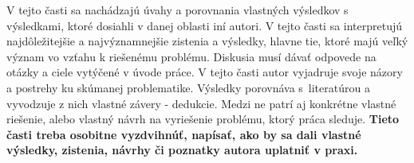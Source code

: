 \documentclass[../praca.tex]{subfiles}
\begin{document}
V tejto časti sa nachádzajú úvahy a porovnania vlastných výsledkov s výsledkami,
ktoré dosiahli v danej oblasti iní autori. V tejto časti sa interpretujú
najdôležitejšie a najvýznamnejšie zistenia a výsledky, hlavne tie, ktoré majú
veľký význam vo vzťahu k riešenému problému. Diskusia musí dávať odpovede na
otázky a ciele vytýčené v úvode práce. V tejto časti autor vyjadruje svoje
názory a postrehy ku skúmanej problematike. Výsledky porovnáva s~literatúrou a
vyvodzuje z nich vlastné závery - dedukcie. Medzi ne patrí aj konkrétne vlastné
riešenie, alebo vlastný návrh na vyriešenie problému, ktorý práca sleduje.
\textbf{Tieto časti treba osobitne vyzdvihnúť, napísať, ako by sa dali vlastné
    výsledky, zistenia, návrhy či poznatky autora uplatniť v praxi.}
\end{document}
